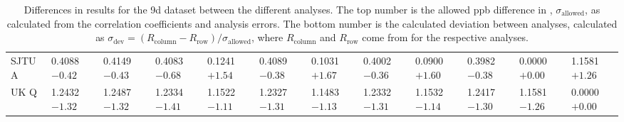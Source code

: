 \begin{landscape}
\begin{table}
\begin{tabularx}{1\linewidth}{@{\extracolsep{\fill}}lXXXXXXXXXXX}
	SJTU A & 0.4088 $-0.42$ & 0.4149 $-0.43$ & 0.4083 $-0.68$ & 0.1241 $+1.54$ & 0.4089 $-0.38$ & 0.1031 $+1.67$ & 0.4002 $-0.36$ & 0.0900 $+1.60$ & 0.3982 $-0.38$ & 0.0000 $+0.00$ & 1.1581 $+1.26$  \\
	UK Q   & 1.2432 $-1.32$ & 1.2487 $-1.32$ & 1.2334 $-1.41$ & 1.1522 $-1.11$ & 1.2327 $-1.31$ & 1.1483 $-1.13$ & 1.2332 $-1.31$ & 1.1532 $-1.14$ & 1.2417 $-1.30$ & 1.1581 $-1.26$ & 0.0000 $+0.00$  \\
  \bottomrule
\end{tabularx}
\caption[]{Differences in results for the 9d dataset between the different analyses. The top number is the allowed ppb difference in \R, $\sigma_{\text{allowed}}$, as calculated from the correlation coefficients and analysis errors. The bottom number is the calculated deviation between analyses, calculated as $\sigma_{\text{dev}} = (R_{\text{column}}-R_{\text{row}})/\sigma_{\text{allowed}}$, where $R_{\text{column}}$ and $R_{\text{row}}$ come from  for the respective analyses.}
\label{tab:9d_diff}
\end{table}
\end{landscape}




